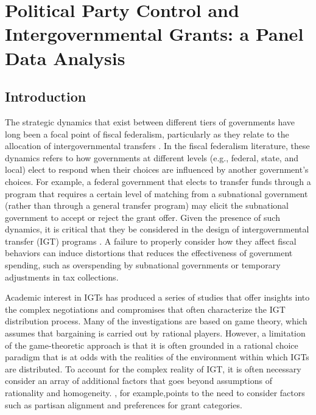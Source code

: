 \chapter{Political Party Control and Intergovernmental Grants: a Panel Data Analysis}


\section{Introduction}
The strategic dynamics that exist between different tiers of governments have long been a focal point of fiscal federalism, particularly as they relate to the allocation of intergovernmental transfers \parencite{agrawal2022local,dahlby1996fiscal,gordon1983optimal}. In the fiscal federalism literature, these dynamics refers to how governments at different levels (e.g., federal, state, and local) elect to respond when their choices are influenced by another government's choices.  For example, a federal government that elects to transfer funds through a program that requires a certain level of matching from a subnational government (rather than through a general transfer program) may elicit the subnational government to accept or reject the grant offer. Given the presence of such dynamics, it is critical that they be considered in the design of intergovernmental transfer (IGT) programs \parencite{dahlby1996fiscal,gordon1983optimal}. A failure to properly consider how they affect fiscal behaviors can induce distortions that reduces the effectiveness of government spending, such as overspending by subnational governments or temporary adjustments in tax collections\parencite{bailey1998flypaper,inman2008flypaper,turnbull1998overspending}.

Academic interest in IGTs has produced a series of studies that offer insights into the complex negotiations and compromises that often characterize the IGT distribution process\parencite{chubb1985political,dixit1995redistributive,weingast1979rational}. Many of the investigations are based on game theory, which assumes that bargaining is carried out by rational players\parencite{banks2006general,baron1989bargaining,martin2018dividing}. However, a limitation of the game-theoretic approach is that it is often grounded in a rational choice paradigm that is at odds with the realities of the environment within which IGTs are distributed. To account for the complex reality of IGT, it is often necessary consider an array of additional factors that goes beyond assumptions of rationality and homogeneity\parencite{golden2008pork,milligan2005regional,petry1999electoral,tellier2006public}. \textcite{rosenstiel2021congressional}, for example,points to the need to consider factors such as partisan alignment and preferences for grant categories.

